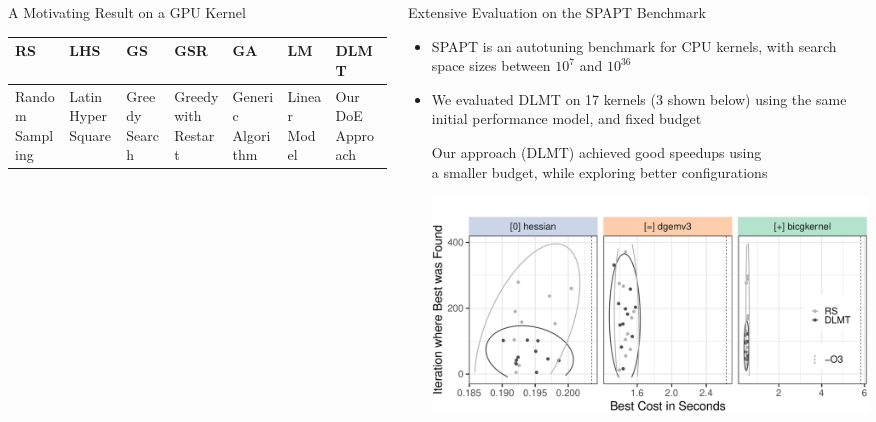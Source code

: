 \documentclass[11pt, compress, aspectratio=169, xcolor={table,usenames,dvipsnames}]{beamer}
\begin{document}
\begin{frame}
\begin{columns}
\begin{column}{0.89\columnwidth}
\begin{columns}
\begin{column}[t]{0.48\columnwidth}
\begin{block}{A Motivating Result on a GPU Kernel}
\begin{table}[htbp]
\centering
\tiny
\begin{tabular}{p{}p{}p{}p{}p{}p{}p{}}
\toprule
RS & LHS & GS & GSR & GA & LM & DLMT\\
\midrule
Random Sampling & Latin Hyper Square & Greedy Search & Greedy with Restart & Generic Algorithm & Linear Model & Our DoE Approach\\
\bottomrule
\end{tabular}
\end{table}
\end{block}
\end{column}
\begin{column}[t]{0.48\columnwidth}
\begin{block}{ \vphantom{g}Extensive Evaluation on the SPAPT Benchmark}
\begin{itemize}
\item \alert{SPAPT} is an \alert{autotuning benchmark} for \alert{CPU kernels}, with \alert{search space sizes}
between \alert{\(10^7\) and \(10^{36}\)}
\item We evaluated \alert{DLMT} on \alert{17 kernels} (\alert{3} shown below)
using \alert{the same initial performance model}, and \alert{fixed budget}

\vspace{0.3em}
\begin{center}
{\small
Our approach (\alert{DLMT}) achieved \alert{good speedups} using
  \\[0.3em] a \alert{smaller budget}, while \alert{exploring better
configurations}
}
\end{center}
\begin{center}
\begin{center}
\includegraphics[width=0.85\columnwidth]{../../../img/iteration_best_comparison.pdf}
\end{center}
\end{center}


\end{itemize}
\end{block}
\end{column}
\end{columns}
\end{column}
\end{columns}
\end{frame}
\end{document}
